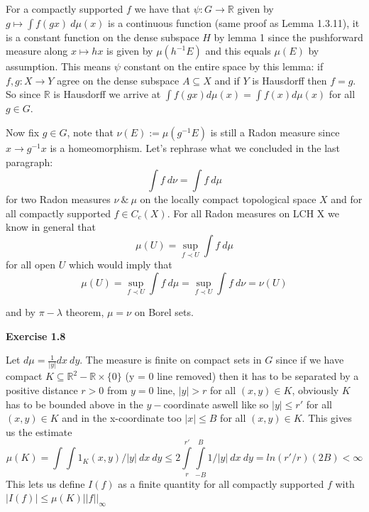 \documentclass{article}
\begin{document}
\vspace{0.5cm}

For a compactly supported $f$ we have that $\psi:G \rightarrow \mathbb R$ given by $g \mapsto \int f(gx) \ d \mu(x)$ is a continuous function (same proof as Lemma 1.3.11), it is a constant function on the dense subspace $H$ by lemma 1 since the pushforward measure along $x \mapsto hx$ is given by $\mu(h^{-1}E)$ and this equals $ \mu(E)$ by assumption. This means $\psi$ constant on the entire space by this lemma: if $f,g : X \rightarrow Y$ agree on the dense subspace $A \subseteq X$ and if $Y$ is Hausdorff then $f = g$. So since $\mathbb R$ is Hausdorff we arrive at $\int f(gx) d \mu(x) = \int f(x) d\mu(x)$ for all $g \in G$.

Now fix $g \in G$, note that $\nu(E) := \mu(g^{-1}E)$ is still a Radon measure since $x \rightarrow g^{-1}x$ is a homeomorphism. Let's rephrase what we concluded in the last paragraph:
$$\int f \ d\nu = \int f \ d\mu$$ for two Radon measures $\nu \ \& \  \mu$ on the locally compact topological space $X$ and for all compactly supported $f \in C_c(X)$. For all Radon measures on LCH X we know in general that $$\mu(U) = \sup\limits_{f \prec U} \int f \ d\mu$$ for all open $U$ which would imply that 
$$\mu(U) = \sup\limits_{f \prec U} \int f \ d\mu = \sup\limits_{f \prec U} \int f \ d\nu = \nu(U)$$

and by $\pi-\lambda$ theorem, $\mu = \nu$ on Borel sets.

\vspace{0.5cm}

\textbf{Exercise 1.8}

\vspace{0.5cm}

Let $d \mu = \frac{1}{|y|} dx \ dy$. The measure is finite on compact sets in $G$ since if we have compact $K \subseteq \mathbb R^2 - \mathbb R \times  \{ 0\}$ (y = 0 line removed) then it has to be separated by a positive distance $r > 0$ from $y = 0$ line, $|y| > r $ for all $(x,y) \in K$, obviously $K$ has to be bounded above in the $y-$coordinate aswell like so $|y| \leq r'$ for all $(x,y) \in K$ and in the x-coordinate too $|x| \leq B$ for all $(x,y) \in K$. This gives us the estimate $$\mu(K) = \int \int 1_K(x,y)/|y| \  dx \ dy \leq  2 \int\limits_{r}^{r'} \int\limits_{-B}^B 1/|y| \  dx \ dy = ln(r'/r)(2B) < \infty$$
\vspace{0.3cm}
This lets us define $I(f)$ as a finite quantity for all compactly supported $f$ with $|I(f)| \leq \mu(K) ||f||_{\infty}$
\end{document}
